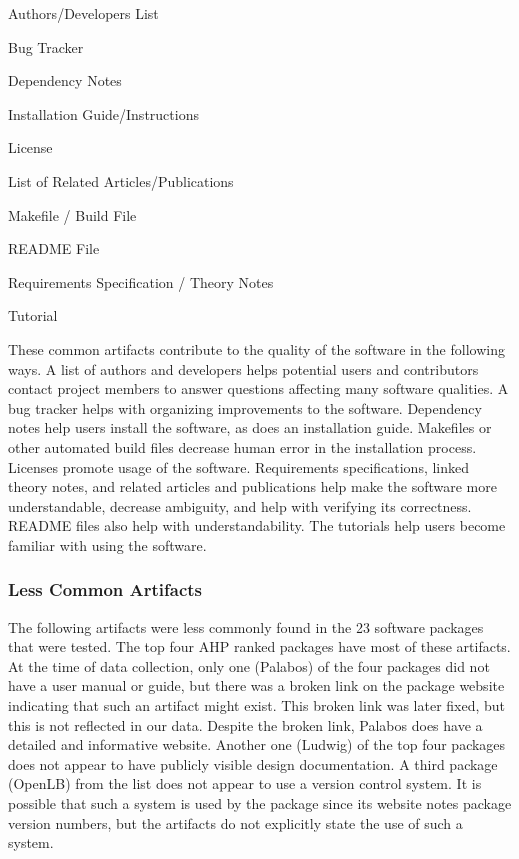 \documentclass[12pt, notitlepage]{article}
\begin{document}
\begin{multicols}{2}	
\begin{itemize}
\end{itemize}
\end{multicols}


These common artifacts contribute to the quality of the software in the following ways. A list of authors and developers helps potential users and contributors contact project members to answer questions affecting many software qualities. A bug tracker helps with organizing improvements to the software. Dependency notes help users install the software, as does an installation guide. Makefiles or other automated build files decrease human error in the installation process. Licenses promote usage of the software. Requirements specifications, linked theory notes, and related articles and publications help make the software more understandable, decrease ambiguity, and help with verifying its correctness. README files also help with understandability. The tutorials help users become familiar with using the software.


\subsubsection{Less Common Artifacts}\label{lesscommon}
The following artifacts were less commonly found in the 23 software packages that were tested. The top four AHP ranked packages have most of these artifacts.
At the time of data collection, only one (Palabos) of the four packages did not have a user manual or guide, but there was a broken link on the package website indicating that such an artifact might exist. This broken link was later fixed, but this is not reflected in our data. Despite the broken link, Palabos does have a detailed and informative website. Another one (Ludwig) of the top four packages does not appear to have publicly visible design documentation. A third package (OpenLB) from the list does not appear to use a version control system. It is possible that such a system is used by the package since its website notes package version numbers, but the artifacts do not explicitly state the use of such a system.
\end{document}
